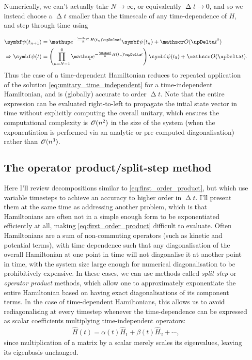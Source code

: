 Numerically, we can't actually take $N\rightarrow\infty$, or equivalently $\upDelta t \rightarrow 0$, and so we instead choose a $\upDelta t$ smaller than the timescale of any time-dependence of $H$, and step through time using

\begin{align}\label{eq:first_order_product}
\vec \psi(t_{n+1}) &=
\ee^{-\frac \ii \hbar  H(t_n)\upDelta t}\vec \psi(t_n) + \Ord{\upDelta t^2}\\
\Rightarrow \vec \psi(t) &=
\left(\prod_{n=N-1}^0 \ee^{-\frac \ii \hbar  H(t_n)\upDelta t} \right)\vec \psi(t_0) + \Ord{\upDelta t}.
\end{align}
Thus the case of a time-dependent Hamiltonian reduces to repeated application of the solution \eqref{eq:unitary_time_independent} for a time-independent Hamiltonian, and is (globally) accurate to order $\upDelta t$. Note that the entire expression can be evaluated right-to-left to propagate the intial state vector in time without explicitly computing the overall unitary, which ensures the computational complexity is $\mathscr{O}(n^2)$ in the size of the system (when the exponentiation is performed via an analytic or pre-computed diagonalisation) rather than $\mathscr{O}(n^3)$.

\subsection{The operator product/split-step method}\label{sec:split-step}

Here I'll review decompositions similar to \eqref{eq:first_order_product}, but which use variable timesteps to achieve an accuracy to higher order in $\upDelta t$. I'll present them at the same time as addressing another problem, which is that Hamiltonians are often not in a simple enough form to be exponentiated efficiently at all, making \eqref{eq:first_order_product} difficult to evaluate. Often Hamiltonians are a sum of non-commuting operators (such as kinetic and potential terms), with time dependence such that any diagonalisation of the overall Hamiltonian at one point in time will not diagonalise it at another point in time, with the system size large enough for numerical diagonalisation to be prohibitively expensive. In these cases, we can use methods called \emph{split-step} or \emph{operator product} methods, which allow one to approximately exponentiate the entire Hamiltonian based on having exact diagonalisations of its component terms. In the case of time-dependent Hamiltonians, this allows us to avoid rediagonalising at every timestep whenever the time-dependence can be expressed as scalar coefficients multiplying time-independent operators:
\begin{align}
\hat H(t) = \alpha(t)\hat H_1 + \beta(t)\hat H_2 + \cdots,
\end{align}
since multiplication of a matrix by a scalar merely scales its eigenvalues, leaving its eigenbasis unchanged.

